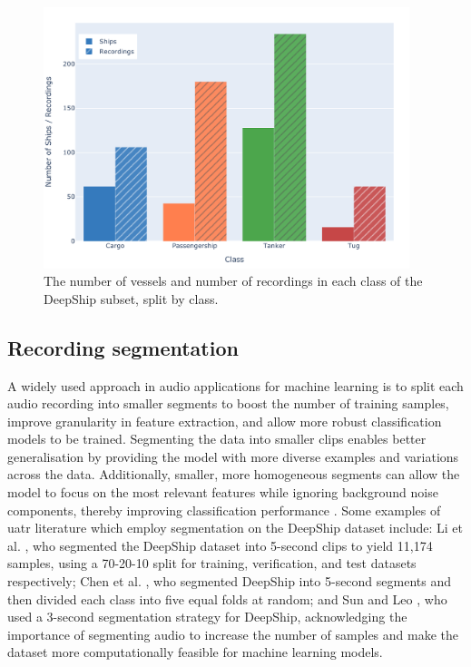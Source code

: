 \begin{figure}[p]
    \centering
    \includegraphics[width=0.95\textwidth]{img/ch3/deepship_class_analysis.pdf}
    \caption{The number of vessels and number of recordings in each class of the DeepShip subset, split by class.}
    \label{fig:deepship-subset-number-vessels}
\end{figure}

\subsection{Recording segmentation}\label{subsec:segmentation}

A widely used approach in audio applications for machine learning is to split each audio recording into smaller segments to boost the number of training samples, improve granularity in feature extraction, and allow more robust classification models to be trained. Segmenting the data into smaller clips enables better generalisation by providing the model with more diverse examples and variations across the data. Additionally, smaller, more homogeneous segments can allow the model to focus on the most relevant features while ignoring background noise components, thereby improving classification performance \cite{xu_self-supervised_2023}. Some examples of \acrshort{uatr} literature which employ segmentation on the DeepShip dataset include: Li et al. \cite{li_underwater_2022}, who segmented the DeepShip dataset into 5-second clips to yield 11,174 samples, using a 70-20-10 split for training, verification, and test datasets respectively; Chen et al. \cite{chen_hierarchical_2024}, who segmented DeepShip into 5-second segments and then divided each class into five equal folds at random; and Sun and Leo \cite{sun_underwater_2023}, who used a 3-second segmentation strategy for DeepShip, acknowledging the importance of segmenting audio to increase the number of samples and make the dataset more computationally feasible for machine learning models. 


